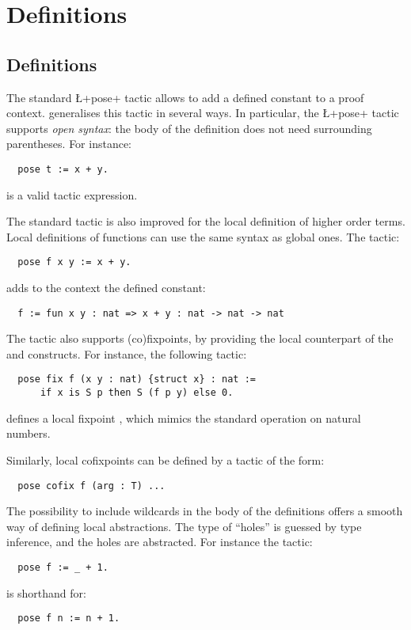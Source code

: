 \section{Definitions}

\subsection{Definitions}\label{ssec:pose}

The standard \L+pose+ tactic allows to add a defined constant to a
proof context. \ssr{} generalises this tactic in several ways.
In particular, the \ssr{} \L+pose+ tactic supports \emph{open syntax}:
the body of
the definition does not need surrounding parentheses. For instance:
\begin{lstlisting}
  pose t := x + y.
\end{lstlisting}
is a valid tactic expression.

The standard  tactic is also improved for the
local definition of higher order terms.
Local definitions of functions can use the same syntax as
global ones. The tactic:
\begin{lstlisting}
  pose f x y := x + y.
\end{lstlisting}
adds to the context the defined constant:
\begin{lstlisting}
  f := fun x y : nat => x + y : nat -> nat -> nat
\end{lstlisting}

The \ssr{}  tactic also supports (co)fixpoints,
by providing the local counterpart of the 
 and  constructs.
For instance, the following tactic:
\begin{lstlisting}
  pose fix f (x y : nat) {struct x} : nat := 
      if x is S p then S (f p y) else 0.
\end{lstlisting}
defines a local fixpoint , which mimics the standard 
operation on natural numbers.

Similarly, local cofixpoints can be defined by a tactic of the form:
\begin{lstlisting}
  pose cofix f (arg : T) ...
\end{lstlisting}

The possibility to include wildcards in the body of the definitions
 offers a smooth
way of defining local abstractions. The type of ``holes'' is
guessed by type inference, and the holes are abstracted.
For instance the tactic:
\begin{lstlisting}
  pose f := _ + 1.
\end{lstlisting}
is shorthand for:
\begin{lstlisting}
  pose f n := n + 1.
\end{lstlisting}

